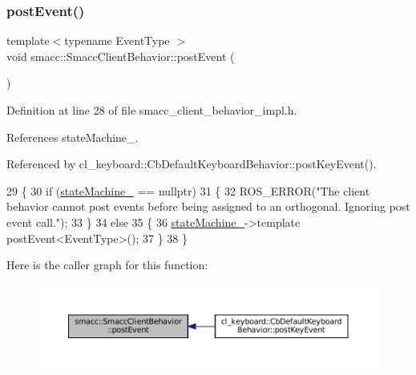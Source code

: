 \subsubsection{\texorpdfstring{post\+Event()}{postEvent()}\hspace{0.1cm}{\footnotesize\ttfamily [2/2]}}
{\footnotesize\ttfamily template$<$typename Event\+Type $>$ \\
void smacc\+::\+Smacc\+Client\+Behavior\+::post\+Event (\begin{DoxyParamCaption}{ }\end{DoxyParamCaption})}



Definition at line 28 of file smacc\+\_\+client\+\_\+behavior\+\_\+impl.\+h.



References state\+Machine\+\_\+.



Referenced by cl\+\_\+keyboard\+::\+Cb\+Default\+Keyboard\+Behavior\+::post\+Key\+Event().


\begin{DoxyCode}
29 \{
30     \textcolor{keywordflow}{if} (\hyperlink{classsmacc_1_1SmaccClientBehavior_a7950b5684d6de0a8e8959c0936ce9a19}{stateMachine\_} == \textcolor{keyword}{nullptr})
31     \{
32         ROS\_ERROR(\textcolor{stringliteral}{"The client behavior cannot post events before being assigned to an orthogonal. Ignoring
       post event call."});
33     \}
34     \textcolor{keywordflow}{else}
35     \{
36         \hyperlink{classsmacc_1_1SmaccClientBehavior_a7950b5684d6de0a8e8959c0936ce9a19}{stateMachine\_}->template postEvent<EventType>();
37     \}
38 \}
\end{DoxyCode}
Here is the caller graph for this function\+:
\nopagebreak
\begin{figure}[H]
\begin{center}
\leavevmode
\includegraphics[width=350pt]{classsmacc_1_1SmaccClientBehavior_a3152cd2215ebc0e387a8a546de07cded_icgraph}
\end{center}
\end{figure}
\mbox{\label{classsmacc_1_1SmaccClientBehavior_a917f001e763a1059af337bf4e164f542}} 
